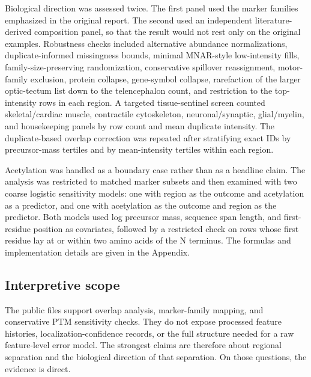 Biological direction was assessed twice. The first panel used the marker families emphasized in the original report. The second used an independent literature-derived composition panel, so that the result would not rest only on the original examples. Robustness checks included alternative abundance normalizations, duplicate-informed missingness bounds, minimal MNAR-style low-intensity fills, family-size-preserving randomization, conservative spillover reassignment, motor-family exclusion, protein collapse, gene-symbol collapse, rarefaction of the larger optic-tectum list down to the telencephalon count, and restriction to the top-intensity rows in each region. A targeted tissue-sentinel screen counted skeletal/cardiac muscle, contractile cytoskeleton, neuronal/synaptic, glial/myelin, and housekeeping panels by row count and mean duplicate intensity. The duplicate-based overlap correction was repeated after stratifying exact IDs by precursor-mass tertiles and by mean-intensity tertiles within each region.

Acetylation was handled as a boundary case rather than as a headline claim. The analysis was restricted to matched marker subsets and then examined with two coarse logistic sensitivity models: one with region as the outcome and acetylation as a predictor, and one with acetylation as the outcome and region as the predictor. Both models used log precursor mass, sequence span length, and first-residue position as covariates, followed by a restricted check on rows whose first residue lay at or within two amino acids of the N terminus. The formulas and implementation details are given in the Appendix.

\subsection{Interpretive scope}

The public files support overlap analysis, marker-family mapping, and conservative PTM sensitivity checks. They do not expose processed feature histories, localization-confidence records, or the full structure needed for a raw feature-level error model. The strongest claims are therefore about regional separation and the biological direction of that separation. On those questions, the evidence is direct.
